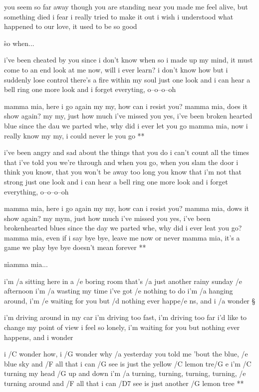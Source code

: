 you seem so far away though you are standing near
you made me feel alive, but something died i fear
i really tried to make it out i wish i understood
what happened to our love, it used to be so good

\r  so when...




i've been cheated by you since i don't know when
so i made up my mind, it must come to an end
look at me now, will i ever learn?
i don't know how but i suddenly lose control
there's a fire within my soul
just one look and i can hear a bell ring
one more look and i forget everyting, o--o--o--oh

\R  mamma mia, here i go again
    my my, how can i resist you?
    mamma mia, does it show again?
    my my, just how much i've missed you
    yes, i've been broken hearted
    blue since the dau we parted
    whe, why did i ever let you go
    mamma mia, now i really know
    my my, i could never le you go **

i've been angry and sad about the things that you do
i can't count all the times that i've told you we're through
and when you go, when you slam the door
i think you know, that you won't be away too long
you know that i'm not that strong
just one look and i can hear a bell ring
one more look and i forget everything, o--o--o--oh

\R  mamma mia, here i go again
my my, how can i resist you?
mamma mia, dows it show again?
my mym, just how much i've missed you
yes, i've been brokenhearted
blues since the day we parted
whe, why did i ever leat you go?
mamma mia, even if i say
bye bye, leave me now or never
mamma mia, it's a game we play
bye bye doesn't mean forever **

\r  mamma mia...




i'm /a sitting here in a /e boring room
that's /a just another rainy sunday /e afternoon
i'm /a wasting my time i've got /e nothing to do
i'm /a hanging around, i'm /e waiting for you
but /d nothing ever happe/e ns, and i /a wonder \S

i'm driving around in my car
i'm driving too fast, i'm driving too far
i'd like to change my point of view
i feel so lonely, i'm waiting for you
but nothing ever happens, and i wonder

\R  i /C wonder how, i /G wonder why
    /a yesterday you told me 'bout the blue, /e blue sky
    and /F all that i can /G see is just the yellow /C lemon tre/G e
    i'm /C turning my head /G up and down
    i'm /a turning, turning, turning, turning, /e turning around
    and /F all that i can /D7 see is just another /G lemon tree **

